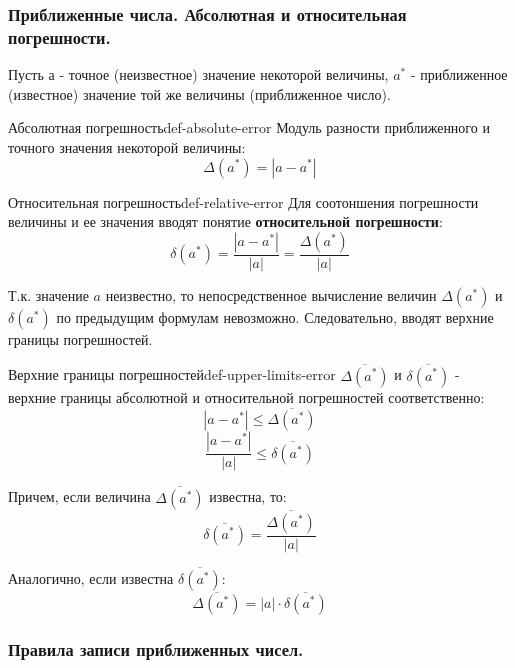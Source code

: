 \documentclass[14pt]{extarticle}
\begin{document}
    \clearpage
    \subsubsection{Приближенные числа. Абсолютная и относительная погрешности.}
        
        Пусть $а$ - точное (неизвестное) значение некоторой величины, $a^{*}$ - приближенное (известное) значение той же величины (приближенное число).

        \begin{definition}{Абсолютная погрешность}{def-absolute-error}
            Модуль разности приближенного и точного значения некоторой величины:
            $$\Delta(a^{*}) = |a - a^{*}|$$
        \end{definition}

        \begin{definition}{Относительная погрешность}{def-relative-error}
            Для соотоншения погрешности величины и ее значения вводят понятие \textbf{относительной погрешности}:
            $$\delta(a^{*}) = \frac{|a - a^{*}|}{|a|} = \frac{\Delta(a^{*})}{|a|}$$
        \end{definition}

        Т.к. значение $a$ неизвестно, то непосредственное вычисление величин $\Delta(a^{*})$ и $\delta(a^{*})$ по предыдущим формулам невозможно. Следовательно, вводят верхние границы погрешностей.

        \begin{definition}{Верхние границы погрешностей}{def-upper-limits-error}
            $\overline{\Delta(a^{*})}$ и $\overline{\delta(a^{*})}$ - верхние границы абсолютной и относительной погрешностей соответственно:
            $$|a - a^{*}| \leq \overline{\Delta(a^{*})}$$
            $$\frac{|a - a^{*}|}{|a|} \leq \overline{\delta(a^{*})}$$

            Причем, если величина $\overline{\Delta(a^{*})}$ известна, то:
            $$\overline{\delta(a^{*})} = \frac{\overline{\Delta(a^{*})}}{|a|}$$

            Аналогично, если известна $\overline{\delta(a^{*})}$:
            $$\overline{\Delta(a^{*})} = |a| \cdot \overline{\delta(a^{*})}$$            
        \end{definition}

    \subsubsection{Правила записи приближенных чисел.}
        
\end{document}
